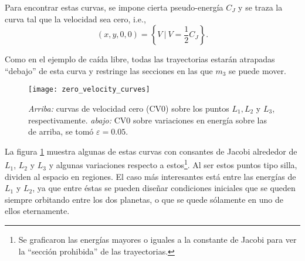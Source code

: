 Para encontrar estas curvas, se impone cierta pseudo-energía $C_J$ y se traza la curva tal que la velocidad sea cero, i.e.,
\begin{equation*}
 (x,y,0,0) = \left\lbrace V \ | \  V = \frac{1}{2}C_J \right\rbrace.
\end{equation*}

Como en el ejemplo de caída libre, todas las trayectorias estarán atrapadas ``debajo'' de esta curva y restringe las secciones en las que $m_3$ se puede mover. 

\begin{figure}[h!]
 \centering
 \texttt{[image: zero\_velocity\_curves]}
 \caption{\textit{Arriba:} curvas de velocidad cero (CV0) sobre los puntos $L_1, L_2$ y $L_3$, respectivamente. \textit{abajo:} CV0 sobre variaciones en energía sobre las de arriba, se tomó $\varepsilon = 0.05$.}
 \label{fig:zero_velocity_curves}
\end{figure}

La figura \ref{fig:zero_velocity_curves} muestra algunas de estas curvas con consantes de Jacobi alrededor de $L_1$, $L_2$ y $L_3$ y algunas variaciones respecto a estos\footnote{Se graficaron las energías mayores o iguales a la constante de Jacobi para ver la ``sección prohibida'' de las trayectorias.}. Al ser estos puntos tipo silla, dividen al espacio en regiones. El caso más interesantes está entre las energías de $L_1$ y $L_2$, ya que entre éstas se pueden diseñar condiciones iniciales que se queden siempre orbitando entre los dos planetas, o que se quede sólamente en uno de ellos eternamente.

